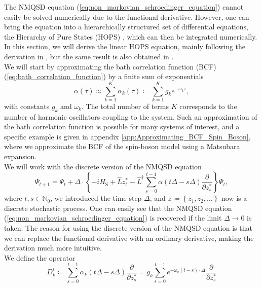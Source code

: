 The NMQSD equation (\ref{eq:non_markovian_schroedinger_equation})
cannot easily be solved numerically due to the functional derivative.
However, one can bring the equation into a hierarchically structured
set of differential equations, the Hierarchy of Pure States (HOPS) \cite{Suess:2014},
which can then be integrated numerically. In this section, we will derive the linear HOPS equation, mainly
following the derivation in \cite{Hartmann:2021}, but the same result is also obtained in \cite{Suess:2014,Hartmann:2017}.
\\
We will start by approximating the bath correlation function (BCF) (\ref{eq:bath_correlation_function}) by a finite sum of exponentials
\begin{equation*}
    \alpha\left(\tau\right) \approx \sum_{k=1}^{K} \alpha_k\left(\tau\right) \coloneqq \sum_{k=1}^{K} g_k e^{-\omega_k\tau},
\end{equation*}
with constants $g_k$ and $\omega_k$. The total number of terms $K$ corresponds
to the number of harmonic oscillators coupling to the system. Such an approximation
of the bath correlation function is possible for many systems of interest, and a specific
example is given in appendix \ref{app:Approximating_BCF_Spin_Boson}, where we approximate the BCF of the spin-boson model
using a Matsubara expansion.
\\
We will work with the discrete version of the NMQSD equation \cite{Hartmann:2021}
\begin{equation}
    \label{eq:discrete_NMQSD_equation}
    \Psi_{t+1} = \Psi_t + \Delta \cdot \left\{
        -iH_\text{S} + \hat{L}z_{t}^* - \hat{L}^\dagger \sum_{s=0}^{t-1} \alpha\left(t\Delta-s\Delta\right)\frac{\partial}{\partial z_{s}^*}
    \right\} \Psi_t,
\end{equation}
where $t, s \in \mathbb{N}_0$, we introduced the time step $\Delta$, and $z \coloneqq \left\{z_{1}, z_{2},\dots\right\}$
now is a discrete stochastic process. One can easily see that the NMQSD equation (\ref{eq:non_markovian_schroedinger_equation}) 
is recovered if the limit $\Delta\rightarrow0$ is taken. The reason for using the discrete version of the NMQSD equation
is that we can replace the functional derivative with an ordinary derivative, making the derivation much more intuitive.
\\
We define the operator
\begin{equation*}
    D_k^t \coloneqq \sum_{s=0}^{t-1} \alpha_k\left(t\Delta - s\Delta\right) \frac{\partial}{\partial z_s^*}
    = g_k \sum_{s=0}^{t-1} e^{-\omega_k\left(t-s\right)\cdot\Delta}
    \frac{\partial}{\partial z_s^*}
\end{equation*}
